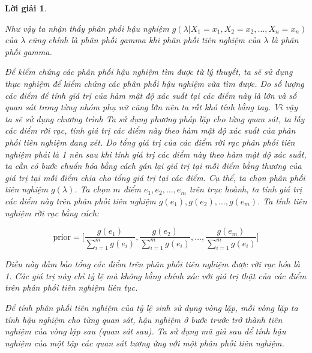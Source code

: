 \documentclass[14pt, a4paper]{article}
\theoremstyle{sltheorem}
\theoremstyle{soltheorem}
\newtheorem*{loigiai}{Lời giải}
\begin{document}
\begin{loigiai}
\begin{enumerate}
\begin{enumerate}[label=(\alph*)]
            Như vậy ta nhận thấy phân phối hậu nghiệm $g(\lambda \vert X_1 =x_1, X_2=x_2, \dots, X_n=x_n)$ của $\lambda$ cũng chính là phân phối gamma khi phân phối tiên nghiệm của $\lambda$ là phân phối gamma.
        \end{enumerate}

        Để kiểm chứng các phân phối hậu nghiệm tìm được từ lý thuyết, ta sẽ sử dụng thực nghiệm để kiểm chứng các phân phối hậu nghiệm vừa tìm được.
        Do số lượng các điểm để tính giá trị của hàm mật độ xác suất tại các điểm này là lớn và số quan sát trong từng nhóm phụ nữ cũng lớn nên ta rất khó tính bằng tay.
        Vì vậy ta sẽ sử dụng chương trình
        Ta sử dụng phương pháp lặp cho từng quan sát, ta lấy các điểm rời rạc, tính giá trị các điểm này theo hàm mật độ xác suất của phân phối tiên nghiệm đang xét.
        Do tổng giá trị của các điểm rời rạc phân phối tiên nghiệm phải là 1 nên sau khi tính giá trị các điểm này theo hàm mật độ xác suất, ta cần có bước chuẩn hóa bằng cách gán lại giá trị tại mỗi điểm bằng thương của giá trị tại mỗi điểm chia cho tổng giá trị tại các điểm.
        Cụ thể, ta chọn phân phối tiên nghiệm $g(\lambda)$.
        Ta chọn $m$ điểm $e_1, e_2, \dots, e_m$ trên trục hoành, ta tính giá trị các điểm này trên phân phối tiên nghiệm $g(e_1), g(e_2), \dots, g(e_m)$.
        Ta tính tiên nghiệm rời rạc bằng cách:

        \begin{equation*}
            \text{prior} = \Big \lbrack \dfrac{g(e_1)}{\sum_{i=1}^m g(e_i)}, \dfrac{g(e_2)}{\sum_{i=1}^m g(e_i)}, \dots, \dfrac{g(e_m)}{\sum_{i=1}^m g(e_i)} \Big \rbrack
        \end{equation*}

        Điều này đảm bảo tổng các điểm trên phân phối tiên nghiệm được rời rạc hóa là 1.
        Các giá trị này chỉ tỷ lệ mà không bằng chính xác với giá trị thật của các điểm trên phân phối tiên nghiệm liên tục.

        Để tính phân phối tiên nghiệm của tỷ lệ sinh sử dụng vòng lặp, mỗi vòng lặp ta tính hậu nghiệm cho từng quan sát, hậu nghiệm ở bước trước trở thành tiên nghiệm của vòng lặp sau (quan sát sau).
        Ta sử dụng mã giả sau để tính hậu nghiệm của một tập các quan sát tương ứng với một phân phối tiên nghiệm.



\end{enumerate}
\end{loigiai}
\end{document}
